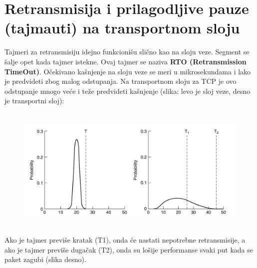 \documentclass[a4paper]{article}
\begin{document}
\section{Retransmisija i prilagodljive pauze (tajmauti) na transportnom sloju}
    Tajmeri za retransmisiju idejno funkcionišu slično kao na sloju veze. Segment se šalje opet
    kada tajmer istekne. Ovaj tajmer se naziva \textbf{RTO (Retransmission TimeOut)}. Očekivano
    kašnjenje na sloju veze se meri u mikrosekundama i lako je predvideti zbog malog odstupanja. Na
    transportnom sloju za TCP je ovo odstupanje mnogo veće i teže predvideti kašnjenje
    (slika: levo je sloj veze, desno je transportni sloj):
    \begin{figure}[H]
        \begin{center}
            \includegraphics[width=120mm,height=60mm]{Slike/tcp_retransmisija.png}
        \end{center}
    \end{figure}
    Ako je tajmer previše kratak (T1), onda će nastati nepotrebne retransmisije, a ako je
    tajmer previše dugačak (T2), onda su lošije performanse svaki put kada se paket zagubi
    (slika desno).
\end{document}

